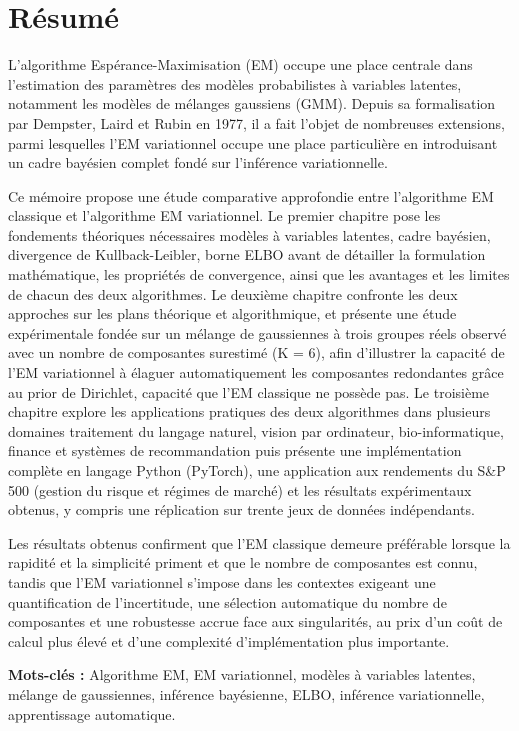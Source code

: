 
\chapter*{Résumé}
L'algorithme Espérance-Maximisation (EM) occupe une place centrale dans l'estimation des paramètres des modèles probabilistes à variables latentes, notamment les modèles de mélanges gaussiens (GMM). Depuis sa formalisation par Dempster, Laird et Rubin en 1977, il a fait l'objet de nombreuses extensions, parmi lesquelles l'EM variationnel occupe une place particulière en introduisant un cadre bayésien complet fondé sur l'inférence variationnelle.

Ce mémoire propose une étude comparative approfondie entre l'algorithme EM classique et l'algorithme EM variationnel. Le premier chapitre pose les fondements théoriques nécessaires  modèles à variables latentes, cadre bayésien, divergence de Kullback-Leibler, borne ELBO  avant de détailler la formulation mathématique, les propriétés de convergence, ainsi que les avantages et les limites de chacun des deux algorithmes. Le deuxième chapitre confronte les deux approches sur les plans théorique et algorithmique, et présente une étude expérimentale fondée sur un mélange de gaussiennes à trois groupes réels observé avec un nombre de composantes surestimé (K = 6), afin d'illustrer la capacité de l'EM variationnel à élaguer automatiquement les composantes redondantes grâce au prior de Dirichlet, capacité que l'EM classique ne possède pas. Le troisième chapitre explore les applications pratiques des deux algorithmes dans plusieurs domaines  traitement du langage naturel, vision par ordinateur, bio-informatique, finance et systèmes de recommandation  puis présente une implémentation complète en langage Python (PyTorch), une application aux rendements du S\&P 500 (gestion du risque et régimes de marché) et les résultats expérimentaux obtenus, y compris une réplication sur trente jeux de données indépendants.

Les résultats obtenus confirment que l'EM classique demeure préférable lorsque la rapidité et la simplicité priment et que le nombre de composantes est connu, tandis que l'EM variationnel s'impose dans les contextes exigeant une quantification de l'incertitude, une sélection automatique du nombre de composantes et une robustesse accrue face aux singularités, au prix d'un coût de calcul plus élevé et d'une complexité d'implémentation plus importante.

\textbf{Mots-clés : }Algorithme EM, EM variationnel, modèles à variables latentes, mélange de gaussiennes, inférence bayésienne, ELBO, inférence variationnelle, apprentissage automatique.


